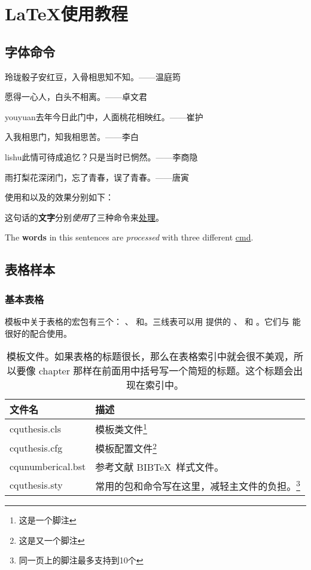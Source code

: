 \chapter{\LaTeX{}使用教程}

\section{字体命令}\label{txt:FreqCmd}
{\kaishu 玲珑骰子安红豆，入骨相思知不知。\hfill ——温庭筠}
	
{\fangsong 愿得一心人，白头不相离。\hfill ——卓文君}
		
{\ifcsname youyuan\endcsname\youyuan\else[无 \cs{youyuan} 字体。]\fi 去年今日此门中，人面桃花相映红。\hfill ——崔护}
			
{\heiti 入我相思门，知我相思苦。\hfill ——李白}
				
{\ifcsname lishu\endcsname\lishu\else[无 \cs{lishu} 字体。]\fi 此情可待成追忆？只是当时已惘然。\hfill ——李商隐}
					
{\songti 雨打梨花深闭门，忘了青春，误了青春。\hfill ——唐寅}

使用和以及的效果分别如下：

这句话的\textbf{文字}分别\textit{使用}了三种命令来\underline{处理}。

The \textbf{words} in this sentences are \textit{processed} with three different \underline{cmd}.

\section{表格样本}

\subsection{基本表格}
\label{sec:basictable}

模板中关于表格的宏包有三个： 、 和。三线表可以用 提供的 、 和 。它们与 能很好的配合使用。
\begin{table}[htb]
	\centering
	\begin{minipage}[t]{0.9\linewidth} %
	\caption[模板文件]{模板文件。如果表格的标题很长，那么在表格索引中就会很不美观，所以要像 chapter 那样在前面用中括号写一个简短的标题。这个标题会出现在索引中。}
	\label{tab:template-files}
	\begin{tabularx}{\linewidth}{lX}
		\toprule
		{\heiti 文件名} & {\heiti 描述} \\
		\midrule
		cquthesis.cls & 模板类文件\footnote{这是一个脚注}\\
		cquthesis.cfg & 模板配置文件\footnote{这是又一个脚注}\\
		cqunumberical.bst & 参考文献 BIB\TeX\ 样式文件。\\
		cquthesis.sty & 常用的包和命令写在这里，减轻主文件的负担。\footnote{同一页上的脚注最多支持到10个}\\
		\bottomrule
		\end{tabularx}
	\end{minipage}
\end{table}

